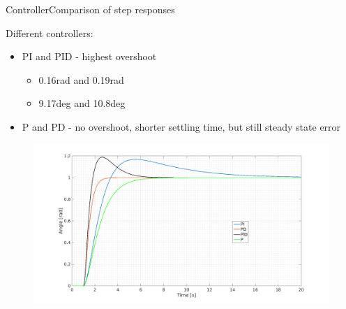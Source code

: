 \begin{frame}{Controller}{Comparison of step responses}
  \begin{block}{Different controllers:}
  
	  \begin{itemize}
	  	\item PI and PID - highest overshoot
	  		  \begin{itemize}
	  			\item 0.16rad and 0.19rad
	  			\item 9.17deg and 10.8deg
	  			\end{itemize}
	  	\item P and PD - no overshoot, shorter settling time, but still steady state error
	  \end{itemize}

	  \begin{figure}
        \includegraphics[scale=0.16]{../report/figures/full_comp.png}
      \end{figure}
  
  \end{block}
\end{frame}

